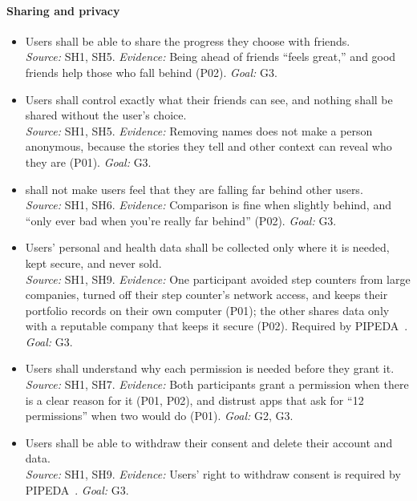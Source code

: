 \documentclass[12pt]{article}
\newcounter{srnum} %
\begin{document}
\paragraph{Sharing and privacy} 

{\sloppy
  \noindent\begin{itemize}
    \item[SR\refstepcounter{srnum}\thesrnum\label{SR_ShareProgress}:] Users shall be able to share the progress they choose with friends.\\
          \emph{Source:} SH1, SH5. \emph{Evidence:} Being ahead of friends ``feels great,'' and good friends help those who fall behind (P02). \emph{Goal:} G3.
    \item[SR\refstepcounter{srnum}\thesrnum\label{SR_ControlSharing}:] Users shall control exactly what their friends can see, and nothing shall be shared without the user's choice.\\
          \emph{Source:} SH1, SH5. \emph{Evidence:} Removing names does not make a person anonymous, because the stories they tell and other context can reveal who they are (P01). \emph{Goal:} G3.
    \item[SR\refstepcounter{srnum}\thesrnum\label{SR_NoHarmfulComparison}:] \progname{} shall not make users feel that they are falling far behind other users.\\
          \emph{Source:} SH1, SH6. \emph{Evidence:} Comparison is fine when slightly behind, and ``only ever bad when you're really far behind'' (P02). \emph{Goal:} G3.
    \item[SR\refstepcounter{srnum}\thesrnum\label{SR_ProtectData}:] Users' personal and health data shall be collected only where it is needed, kept secure, and never sold.\\
          \emph{Source:} SH1, SH9. \emph{Evidence:} One participant avoided step counters from large companies, turned off their step counter's network access, and keeps their portfolio records on their own computer (P01); the other shares data only with a reputable company that keeps it secure (P02). Required by PIPEDA~\citep{PIPEDA}. \emph{Goal:} G3.
    \item[SR\refstepcounter{srnum}\thesrnum\label{SR_ExplainPermissions}:] Users shall understand why each permission is needed before they grant it.\\
          \emph{Source:} SH1, SH7. \emph{Evidence:} Both participants grant a permission when there is a clear reason for it (P01, P02), and distrust apps that ask for ``12 permissions'' when two would do (P01). \emph{Goal:} G2, G3.
    \item[SR\refstepcounter{srnum}\thesrnum\label{SR_ControlOwnData}:] Users shall be able to withdraw their consent and delete their account and data.\\
          \emph{Source:} SH1, SH9. \emph{Evidence:} Users' right to withdraw consent is required by PIPEDA~\citep{PIPEDA}. \emph{Goal:} G3.
  \end{itemize}
  \par}
\end{document}
